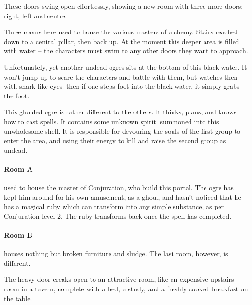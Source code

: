 \begin{multicols}{2}
\begin{enumerate}
\end{enumerate}


\begin{boxtext}
	These doors swing open effortlessly, showing a new room with three more doors; right, left and centre.

\end{boxtext}

Three rooms here used to house the various masters of alchemy.  Stairs reached down to a central pillar, then back up.  At the moment this deeper area is filled with water -- the characters must swim to any other doors they want to approach.

Unfortunately, yet another undead ogres sits at the bottom of this black water.  It won't jump up to scare the characters and battle with them, but watches then with shark-like eyes, then if one steps foot into the black water, it simply grabs the foot.

This ghouled ogre is rather different to the others.
It thinks, plans, and knows how to cast spells.
It contains some unknown spirit, summoned into this unwholesome shell.
It is responsible for devouring the souls of the first group to enter the area, and using their energy to kill and raise the second group as undead.

\label{undead_ogre}

\paragraph{Room A} used to house the master of Conjuration, who build this portal.  The ogre has kept him around for his own amusement, as a ghoul, and hasn't noticed that he has a magical ruby which can transform into any simple substance, as per Conjuration level 2.  The ruby transforms back once the spell has completed.


\paragraph{Room B} houses nothing but broken furniture and sludge.  The last room, however, is different.

\begin{boxtext}
	The heavy door creaks open to an attractive room, like an expensive upstairs room in a tavern, complete with a bed, a study, and a freshly cooked breakfast on the table.
\end{boxtext}


\end{multicols}
